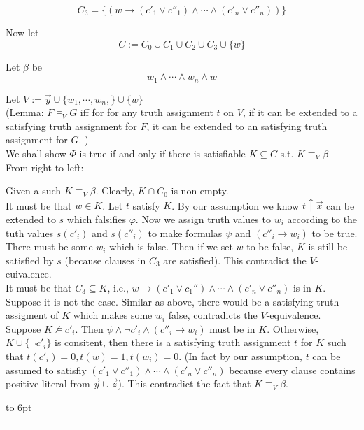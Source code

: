 \documentclass[12pt]{article}
\newenvironment{proof}{\parindent=0pt{\bf Proof: }}{
   \hspace*{\fill}\hbox to 6pt{\leaders\hrule width 6pt height 6pt\hfill}\par}
\begin{document}
\begin{proof}
$$C_3=\{(w\rightarrow (c'_1\vee c''_1)\wedge\cdots\wedge (c'_n\vee c''_n))\}$$

Now let $$C:=C_0\cup C_1\cup C_2\cup C_3\cup\{w\}$$

Let $\beta$ be $$ w_1\wedge\cdots\wedge w_n\wedge w$$

Let $V:=\vec{y}\cup\{w_1,\cdots,w_n,\}\cup\{w\}$\\




(Lemma: $F\models_V G$ iff for for any truth assignment $t$ on $V$, if it can be extended to a satisfying truth assignment for $F$, it can be extended to an satisfying truth assignment for $G$.
) \\

We shall show $\Phi$ is true if and only if there is satisfiable $K\subseteq C$ s.t. $K\equiv_V \beta$\\



\color{red} From right to left:\color{black}

Given a such $K\equiv_V \beta$.
Clearly, $K\cap C_0$ is non-empty.\\



It must be that $w\in K$.
Let $t$ satisfy $K$.
By our assumption we know $t\uparrow\vec{x}$ can be extended to $s$ which falsifies $\varphi$. Now we assign truth values to $w_i$ according to the tuth values $s(c'_i)$ and $s(c''_i)$ to make formulas $\psi$ and  $(c''_i\rightarrow w_i)$ to be true. There  must be some $w_i$ which is false. Then if we set $w$ to be false, $K$ is still be satisfied by $s$ (because clauses in $C_3$ are satisfied). This contradict the $V$-euivalence.\\

It must be that $C_3\subseteq K$, i.e., $w\rightarrow (c'_1\vee c_1'')\wedge\cdots\wedge (c'_n\vee c''_n)$ is in $K$. Suppose it is not the case. Similar as above, there would be a satisfying truth assigment of $K$ which makes some $w_i$ false, contradicts the $V$-equivalence. \\


Suppose $K\not\models c'_i$. Then $\psi\wedge\neg c'_i \wedge (c''_i\rightarrow w_i)$ must be in $K$.
Otherwise, $K\cup\{\neg c'_i\}$ is consitent,  then there is a satisfying truth assignment $t$ for $K$ such that $t(c'_i)=0, t(w)=1, t(w_i)=0$. (In fact by our assumption, $t$ can be assumed to satisfiy $(c'_1\vee c''_1)\wedge\cdots\wedge (c'_n\vee c''_n)$ because every clause contains positive literal from $\vec{y}\cup\vec{z}$). This contradict the fact that $K\equiv_V\beta$.



\end{proof}
\end{document}
